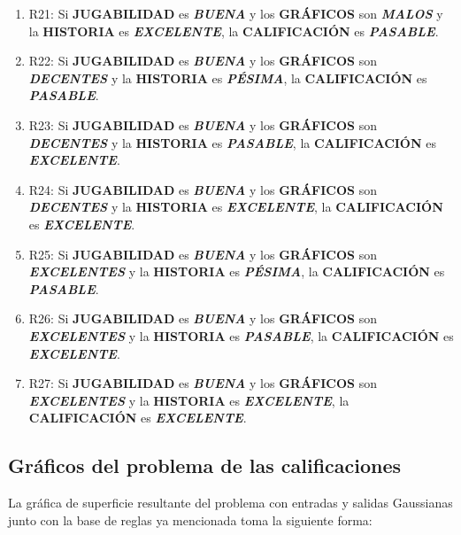 \documentclass[11pt, letterpaper]{article}
\begin{document}
\begin{enumerate}
	\item R21: Si \textbf{JUGABILIDAD} es \textbf{\textit{BUENA}} y los \textbf{GRÁFICOS} son \textbf{\textit{MALOS}} y la \textbf{HISTORIA} es \textbf{\textit{EXCELENTE}}, la \textbf{CALIFICACIÓN} es \textbf{\textit{PASABLE}}.
	\item R22: Si \textbf{JUGABILIDAD} es \textbf{\textit{BUENA}} y los \textbf{GRÁFICOS} son \textbf{\textit{DECENTES}} y la \textbf{HISTORIA} es \textbf{\textit{PÉSIMA}}, la \textbf{CALIFICACIÓN} es \textbf{\textit{PASABLE}}.
	\item R23: Si \textbf{JUGABILIDAD} es \textbf{\textit{BUENA}} y los \textbf{GRÁFICOS} son \textbf{\textit{DECENTES}} y la \textbf{HISTORIA} es \textbf{\textit{PASABLE}}, la \textbf{CALIFICACIÓN} es \textbf{\textit{EXCELENTE}}.
	\item R24: Si \textbf{JUGABILIDAD} es \textbf{\textit{BUENA}} y los \textbf{GRÁFICOS} son \textbf{\textit{DECENTES}} y la \textbf{HISTORIA} es \textbf{\textit{EXCELENTE}}, la \textbf{CALIFICACIÓN} es \textbf{\textit{EXCELENTE}}.
	\item R25: Si \textbf{JUGABILIDAD} es \textbf{\textit{BUENA}} y los \textbf{GRÁFICOS} son \textbf{\textit{EXCELENTES}} y la \textbf{HISTORIA} es \textbf{\textit{PÉSIMA}}, la \textbf{CALIFICACIÓN} es \textbf{\textit{PASABLE}}.
	\item R26: Si \textbf{JUGABILIDAD} es \textbf{\textit{BUENA}} y los \textbf{GRÁFICOS} son \textbf{\textit{EXCELENTES}} y la \textbf{HISTORIA} es \textbf{\textit{PASABLE}}, la \textbf{CALIFICACIÓN} es \textbf{\textit{EXCELENTE}}.
	\item R27: Si \textbf{JUGABILIDAD} es \textbf{\textit{BUENA}} y los \textbf{GRÁFICOS} son \textbf{\textit{EXCELENTES}} y la \textbf{HISTORIA} es \textbf{\textit{EXCELENTE}}, la \textbf{CALIFICACIÓN} es \textbf{\textit{EXCELENTE}}.
\end{enumerate}

\newpage

\subsection{Gráficos del problema de las calificaciones}

La gráfica de superficie resultante del problema con entradas y salidas Gaussianas junto con la base de reglas ya mencionada toma la siguiente forma:
\end{document}

